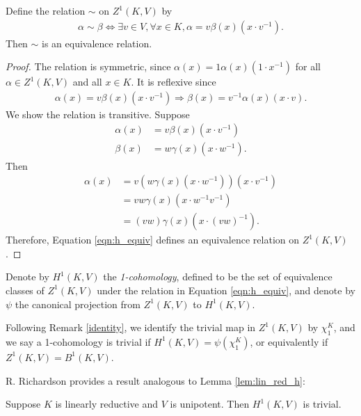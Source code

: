 \begin{lemma} Define the relation $\sim$ on $Z^1(K, V)$ by
	\begin{align}
		\alpha \sim \beta \Leftrightarrow \exists v \in V,\forall x \in K, \alpha = v\beta(x)(x \cdot v^{-1}).
		\label{eqn:h_equiv}
	\end{align}
Then $\sim$ is an equivalence relation.
\end{lemma}
\begin{proof}
The relation is symmetric, since $\alpha(x) = 1\alpha(x)(1 \cdot x^{-1})$ for all $\alpha\in Z^1(K, V)$ and all $x \in K$. It is reflexive since
\begin{align*}
	\alpha(x) = v \beta(x)(x \cdot v^{-1}) \Rightarrow \beta(x) = v^{-1}\alpha(x)(x\cdot v).
\end{align*}
We show the relation is transitive. Suppose
\begin{align*}
	\alpha(x) &= v\beta(x)(x\cdot v^{-1}) \\
	\beta(x) &= w\gamma(x)(x\cdot w^{-1}).
\end{align*}
Then
\begin{align*}
	\alpha(x) &= v\left(w \gamma(x)(x\cdot w^{-1})\right)\left(x\cdot v^{-1}\right) \\
		&= vw \gamma(x)\left(x\cdot w^{-1}v^{-1}\right) \\
		&= (vw) \gamma(x)\left(x\cdot (vw)^{-1}\right).
\end{align*}
Therefore, Equation \ref{eqn:h_equiv} defines an equivalence relation on $Z^1(K, V)$.
\end{proof}

\begin{definition}
Denote by $H^1(K, V)$ the \emph{1-cohomology}, defined to be the set of equivalence classes of $Z^1(K, V)$ under the relation in Equation \ref{eqn:h_equiv}, and denote by $\psi$ the canonical projection from $Z^1(K, V)$ to $H^1(K, V)$.
\end{definition}

\begin{remark}\label{trivial}
Following Remark \ref{identity}, we identify the trivial map in $Z^1(K, V)$ by $\chi^K_1$, and we say a 1-cohomology is trivial if $H^1(K, V) = \psi(\chi^K_1)$, or equivalently if $Z^1(K, V) = B^1(K, V)$.
\end{remark}

R. Richardson \cite[Lemma 6.2.6]{richardson1982orbits} provides a result analogous to Lemma \ref{lem:lin_red_h}:
\begin{lemma}
  Suppose $K$ is linearly reductive and $V$ is unipotent. Then $H^1(K, V)$ is trivial.
  \label{lem:nonab_lin_red}
\end{lemma}

